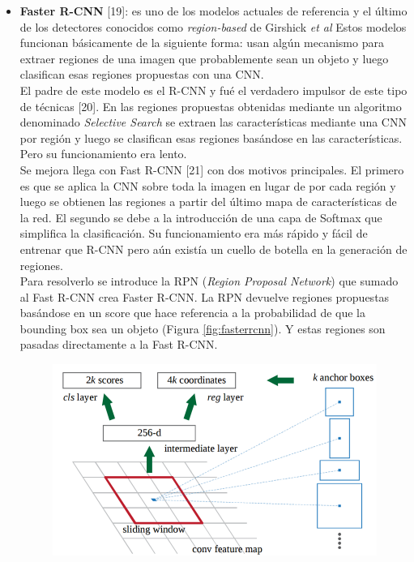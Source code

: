 \documentclass{bmvc2k}
\def\etal{\emph{et al}\bmvaOneDot}
\begin{document}
\begin{itemize}
\item \textbf{Faster R-CNN} [19]: es uno de los modelos actuales de referencia y el último de los detectores conocidos como \textit{region-based} de Girshick \etal{} Estos modelos funcionan básicamente de la siguiente forma: usan algún mecanismo para extraer regiones de una imagen que probablemente sean un objeto y luego clasifican esas regiones propuestas con una CNN.\\ El padre de este modelo es el R-CNN y fué el verdadero impulsor de este tipo de técnicas [20]. En las regiones propuestas obtenidas mediante un algoritmo denominado \textit{Selective Search} se extraen las características mediante una CNN por región y luego se clasifican esas regiones basándose en las características. Pero su funcionamiento era lento.\\
Se mejora llega con Fast R-CNN [21] con dos motivos principales. El primero es que se aplica la CNN sobre toda la imagen en lugar de por cada región y luego se obtienen las regiones a partir del último mapa de características de la red. El segundo se debe a la introducción de una capa de Softmax que simplifica la clasificación. Su funcionamiento era más rápido y fácil de entrenar que R-CNN pero aún existía un cuello de botella en la generación de regiones.\\
Para resolverlo se introduce la RPN (\textit{Region Proposal Network}) que sumado al Fast R-CNN crea Faster R-CNN. La RPN devuelve regiones propuestas basándose en un score que hace referencia a la probabilidad de que la bounding box sea un objeto (Figura \ref{fig:fasterrcnn}). Y estas regiones son pasadas directamente a la Fast R-CNN.\\
\begin{figure}[h!]
\begin{center}
\includegraphics[scale=0.25]{faster_rcnn.png}

\end{center}
\end{figure}
\end{itemize}
\end{document}
